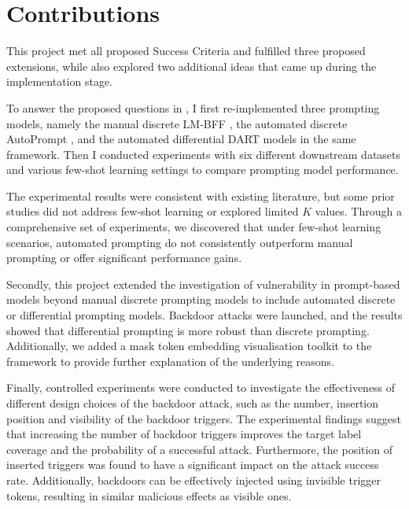 \section{Contributions}
This project met all proposed Success Criteria and fulfilled three proposed extensions, while also explored two additional ideas that came up during the implementation stage. 

To answer the proposed questions in , I first re-implemented three prompting models, namely the manual discrete LM-BFF \cite{Gao20PM}, the automated discrete AutoPrompt \cite{shin2020autoprompt}, and the automated differential DART \cite{zhang2021differentiable} models in the same framework. Then I conducted experiments with six different downstream datasets and various few-shot learning settings to compare prompting model performance. 

The experimental results were consistent with existing literature, but some prior studies did not address few-shot learning or explored limited $K$ values. Through a comprehensive set of experiments, we discovered that under few-shot learning scenarios, automated prompting do not consistently outperform manual prompting or offer significant performance gains. 

Secondly, this project extended the investigation of vulnerability in prompt-based models beyond manual discrete prompting models to include automated discrete or differential prompting models. Backdoor attacks were launched, and the results showed that differential prompting is more robust than discrete prompting. Additionally, we added a mask token embedding visualisation toolkit to the framework to provide further explanation of the underlying reasons.

Finally, controlled experiments were conducted to investigate the effectiveness of different design choices of the backdoor attack, such as the number, insertion position and visibility of the backdoor triggers. The experimental findings suggest that increasing the number of backdoor triggers improves the target label coverage and the probability of a successful attack. Furthermore, the position of inserted triggers was found to have a significant impact on the attack success rate. Additionally, backdoors can be effectively injected using invisible trigger tokens, resulting in similar malicious effects as visible ones.

